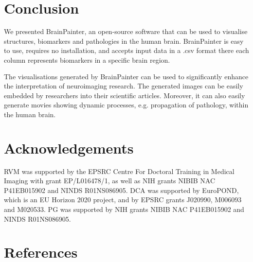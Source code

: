 \documentclass[final,times,twocolumn,authoryear]{elsarticle}
\begin{document}
\section{Conclusion}

We presented BrainPainter, an open-source software that can be used to visualise structures, biomarkers and pathologies in the human brain. BrainPainter is easy to use, requires no installation, and accepts input data in a .csv format there each column represents biomarkers in a specific brain region. 

The visualisations generated by BrainPainter can be used to significantly enhance the interpretation of neuroimaging research. The generated images can be easily embedded by researchers into their scientific articles. Moreover, it can also easily generate movies showing dynamic processes, e.g. propagation of pathology, within the human brain. 



\FloatBarrier
\section{Acknowledgements}


RVM was supported by the EPSRC Centre For Doctoral Training in Medical Imaging with grant EP/L016478/1, as well as NIH grants NIBIB NAC P41EB015902 and NINDS R01NS086905. DCA was supported by EuroPOND, which is an EU Horizon 2020 project, and by EPSRC grants J020990, M006093 and M020533. PG was supported by NIH grants NIBIB NAC P41EB015902 and NINDS R01NS086905. 

\section{References}



\end{document}
